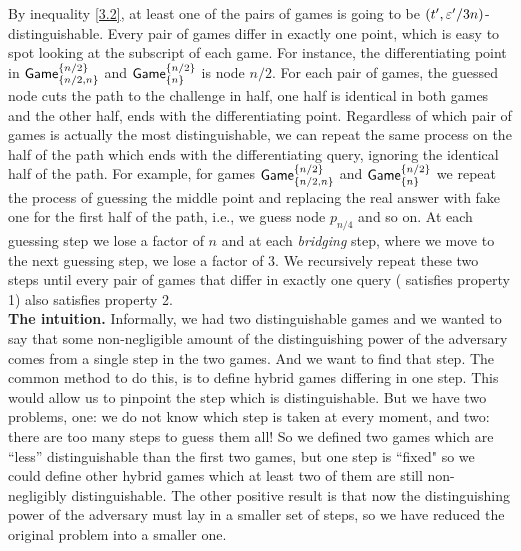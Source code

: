 \documentclass{article}
\newcommand{\game}{{\sf Game}}
\newcommand{\dgb}[2]{\game_{\cub{#1}}^{\cub{#2}}}
\begin{document}
By inequality \ref{3.2}, at least one of the pairs of games is going to be $(t',\varepsilon'/3n)$-distinguishable. Every pair of games differ in exactly one point, which is easy to spot looking at the subscript of each game. For instance, the differentiating point in $\dgb{n/2,n}{n/2}$ and $\dgb{n}{n/2}$ is node $n/2$. For each pair of games, the guessed node cuts the path to the challenge in half, one half is identical in both games and the other half, ends with the differentiating point. Regardless of which pair of games is actually the most distinguishable, we can repeat the same process on the half of the path which ends with the differentiating query, ignoring the identical half of the path. For example, for games $\dgb{n/2,n}{n/2}$ and $\dgb{n}{n/2}$ we repeat the process of guessing the middle point and replacing the real answer with fake one for the first half of the path, i.e., we guess node $p_{n/4}$ and so on. At each guessing step we lose a factor of $n$ and at each \textit{bridging} step, where we move to the next guessing step, we lose a factor of $3$. We recursively repeat these two steps until every pair of games that differ in exactly one query ( satisfies property 1) also satisfies property 2. \\

\noindent \textbf{The intuition.} Informally, we had two distinguishable games and we wanted to say that some non-negligible amount of the distinguishing power of the adversary comes from a single step in the two games. And we want to find that step. The common method to do this, is to define hybrid games differing in one step. This would allow us to pinpoint the step which is distinguishable. But we have two problems, one: we do not know which step is taken at every moment, and two: there are too many steps to guess them all! So we defined two games which are ``less'' distinguishable than the first two games, but one step is ``fixed" so we could define other hybrid games which at least two of them are still non-negligibly distinguishable. The other positive result is that now the distinguishing power of the adversary must lay in a smaller set of steps, so we have reduced the original problem into a smaller one. \\
\end{document}
